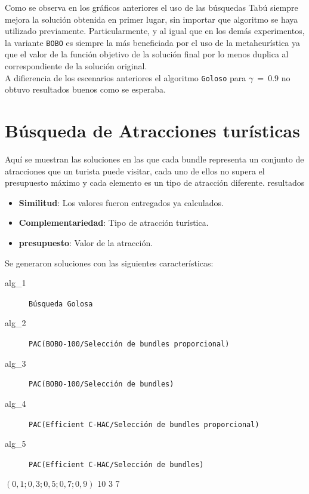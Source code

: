 Como se observa en los gráficos anteriores el uso de las búsquedas Tabú siempre mejora la solución obtenida en primer lugar, sin importar que algoritmo se haya utilizado previamente. Particularmente, y al igual que en los demás experimentos, la variante \texttt{BOBO} es siempre la más beneficiada por el uso de la metaheurística ya que el valor de la función objetivo de la solución final por lo menos duplica al correspondiente de la solución original.\\
A difierencia de los escenarios anteriores el algoritmo \texttt{Goloso} para $\gamma\ =\ 0.9$ no obtuvo resultados buenos como se esperaba.
\newpage
\section{Búsqueda de Atracciones turísticas}\label{res:busAtracciones}
Aquí se muestran las soluciones en las que cada bundle representa un conjunto de atracciones que un turista puede visitar, cada uno de ellos no supera el presupuesto máximo y cada elemento es un tipo de atracción diferente. resultados
\begin{itemize}
  \item \textbf{Similitud}: Los valores fueron entregados ya calculados.
  \item \textbf{Complementariedad}: Tipo de atracción turística.
  \item \textbf{presupuesto}: Valor de la atracción.
\end{itemize}
Se generaron soluciones con las siguientes características:\\
\SolucionBudget
{}
{
\begin{description}
	\item[alg\_1] \texttt{Búsqueda Golosa}
	\item[alg\_2] \texttt{PAC(BOBO-100/Selección de bundles proporcional)}
	\item[alg\_3] \texttt{PAC(BOBO-100/Selección de bundles)}
	\item[alg\_4] \texttt{PAC(Efficient C-HAC/Selección de bundles proporcional)}
	\item[alg\_5] \texttt{PAC(Efficient C-HAC/Selección de bundles)}
\end{description}
}
{$(0,1; 0,3; 0,5; 0,7; 0,9)$}
{10}
{3}
{7}

